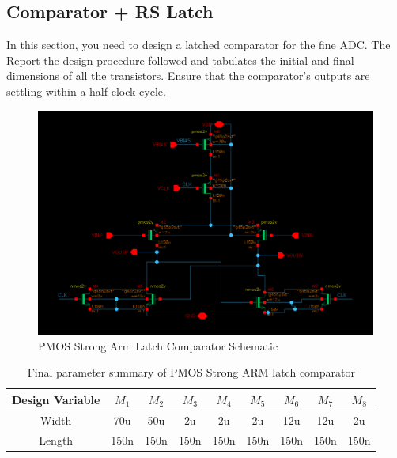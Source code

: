 \documentclass[a4paper,12pt]{article}
\begin{document}
\subsection{Comparator + RS Latch}
In this section, you need to design a latched comparator for the fine ADC. The Report the design procedure followed and tabulates the initial and final dimensions of all the transistors. Ensure that the comparator’s outputs are settling within a half-clock cycle.
\begin{figure}[H]
    \centering
    \includegraphics[max width = \textwidth]{3/3_sch_strongarm.png}
    \caption{PMOS Strong Arm Latch Comparator Schematic}
    \label{fig:enter-label}
\end{figure}

\begin{table}[H]
    \centering
    \begin{tabular}{|c|c|c|c|c|c|c|c|c|}
    \hline
        Design Variable & $M_1$ & $M_2$ & $M_3$ & $M_4$ & $M_5$ & $M_6$ & $M_7$ & $M_8$ \\
        \hline
        Width & 70u & 50u & 2u & 2u & 2u & 12u & 12u & 2u\\
        \hline
        Length & 150n & 150n & 150n & 150n & 150n & 150n & 150n & 150n\\
        \hline
    \end{tabular}
    \caption{Final parameter summary of PMOS Strong ARM latch comparator}
    \label{tab:my_label}
\end{table}
\end{document}
